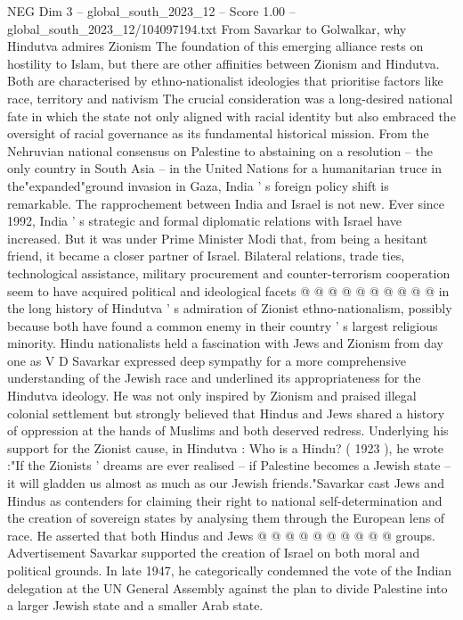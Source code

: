 \begin{textsample}{NEG Dim 3 – global\_south\_2023\_12 – Score 1.00 – global\_south\_2023\_12/104097194.txt}  \label{ex:f3_neg_010}
From Savarkar to Golwalkar, why Hindutva admires Zionism The foundation of this emerging alliance rests on hostility to Islam, but there are other affinities between Zionism and Hindutva.
Both are characterised by ethno-nationalist ideologies that prioritise factors like race, territory and nativism The crucial consideration was a long-desired national fate in which the state not only aligned with racial identity but also embraced the oversight of racial governance as its fundamental historical mission.
From the Nehruvian national consensus on Palestine to abstaining on a resolution -- the only country in South Asia -- in the United Nations for a humanitarian truce in the"expanded"ground invasion in Gaza, India ' s foreign policy shift is remarkable.
The rapprochement between India and Israel is not new.
Ever since 1992, India ' s strategic and formal diplomatic relations with Israel have increased.
But it was under Prime Minister Modi that, from being a hesitant friend, it became a closer partner of Israel.
Bilateral relations, trade ties, technological assistance, military procurement and counter-terrorism cooperation seem to have acquired political and ideological facets @ @ @ @ @ @ @ @ @ @ in the long history of Hindutva ' s admiration of Zionist ethno-nationalism, possibly because both have found a common enemy in their country ' s largest religious minority.
Hindu nationalists held a fascination with Jews and Zionism from day one as V D Savarkar expressed deep sympathy for a more comprehensive understanding of the Jewish race and underlined its appropriateness for the Hindutva ideology.
He was not only inspired by Zionism and praised illegal colonial settlement but strongly believed that Hindus and Jews shared a history of oppression at the hands of Muslims and both deserved redress.
Underlying his support for the Zionist cause, in Hindutva : Who is a Hindu? ( 1923 ), he wrote :"If the Zionists ' dreams are ever realised -- if Palestine becomes a Jewish state -- it will gladden us almost as much as our Jewish friends."Savarkar cast Jews and Hindus as contenders for claiming their right to national self-determination and the creation of sovereign states by analysing them through the European lens of race.
He asserted that both Hindus and Jews @ @ @ @ @ @ @ @ @ @ groups.
Advertisement Savarkar supported the creation of Israel on both moral and political grounds.
In late 1947, he categorically condemned the vote of the Indian delegation at the UN General Assembly against the plan to divide Palestine into a larger Jewish state and a smaller Arab state.

\end{textsample}
